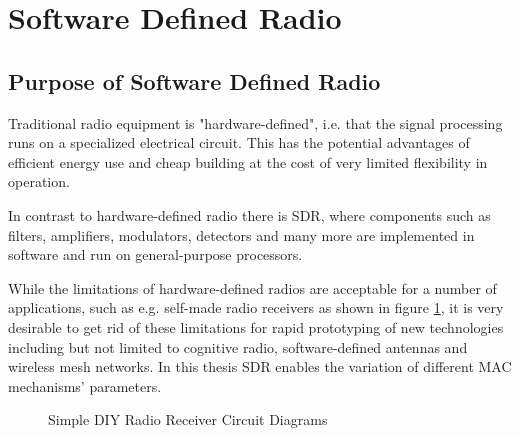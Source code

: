 \section{Software Defined Radio}
 
\subsection{Purpose of Software Defined Radio}

Traditional radio equipment is "hardware-defined", i.e. that the signal processing runs on a specialized electrical circuit. This has the potential advantages of efficient energy use and cheap building at the cost of very limited flexibility in operation. 

In contrast to hardware-defined radio there is SDR, where components such as filters, amplifiers, modulators, detectors and many more are implemented in software and run on general-purpose processors.

While the limitations of hardware-defined radios are acceptable for a number of applications, such as e.g. self-made radio receivers as shown in figure \ref{fig:radio-receiver-circuits}, it is very desirable to get rid of these limitations for rapid prototyping of new technologies including but not limited to cognitive radio, software-defined antennas and wireless mesh networks. In this thesis SDR enables the variation of different MAC mechanisms' parameters.

\begin{figure}[t]
	\label{fig:radio-receiver-circuits}
	\begin{center}
		\qquad
	\end{center}
	\caption{Simple DIY Radio Receiver Circuit Diagrams}
\end{figure}

